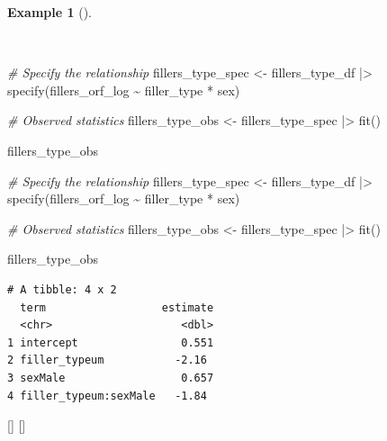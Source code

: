 \documentclass[
  letterpaper,
  krantz1]{latex/krantz-mod}
\newenvironment{Shaded}{\begin{snugshade}}{\end{snugshade}}
\newcommand{\CommentTok}[1]{\textcolor[rgb]{0.00,0.00,0.00}{\textit{#1}}}
\newcommand{\FunctionTok}[1]{\textcolor[rgb]{0.00,0.00,0.00}{#1}}
\newcommand{\NormalTok}[1]{\textcolor[rgb]{0.00,0.00,0.00}{#1}}
\newcommand{\OtherTok}[1]{\textcolor[rgb]{0.00,0.00,0.00}{#1}}
\newcommand{\SpecialCharTok}[1]{\textcolor[rgb]{0.00,0.00,0.00}{#1}}
\newcommand{\cindex}[1]{%
  \StrSubstitute{#1}{_}{\_}[\temp]%
  \index{\temp}%
}
\theoremstyle{definition}
\theoremstyle{definition}
\newtheorem{example}{Example}[chapter]
\theoremstyle{remark}
\begin{document}
\begin{example}[]\protect\hypertarget{exm-infer-num-multi-spec}{}\label{exm-infer-num-multi-spec}

~

\begin{Shaded}
\begin{Highlighting}[numbers=left,,]
\CommentTok{\# Specify the relationship}
\NormalTok{fillers\_type\_spec }\OtherTok{\textless{}{-}}
\NormalTok{  fillers\_type\_df }\SpecialCharTok{|\textgreater{}}
  \FunctionTok{specify}\NormalTok{(fillers\_orf\_log }\SpecialCharTok{\textasciitilde{}}\NormalTok{ filler\_type }\SpecialCharTok{*}\NormalTok{ sex)}

\CommentTok{\# Observed statistics}
\NormalTok{fillers\_type\_obs }\OtherTok{\textless{}{-}}
\NormalTok{  fillers\_type\_spec }\SpecialCharTok{|\textgreater{}}
  \FunctionTok{fit}\NormalTok{()}

\NormalTok{fillers\_type\_obs}
\end{Highlighting}
\end{Shaded}

\vspace{1em}

\begin{Shaded}
\begin{Highlighting}[numbers=left,,]
\CommentTok{\# Specify the relationship}
\NormalTok{fillers\_type\_spec }\OtherTok{\textless{}{-}}
\NormalTok{  fillers\_type\_df }\SpecialCharTok{|\textgreater{}}
  \FunctionTok{specify}\NormalTok{(fillers\_orf\_log }\SpecialCharTok{\textasciitilde{}}\NormalTok{ filler\_type }\SpecialCharTok{*}\NormalTok{ sex)}

\CommentTok{\# Observed statistics}
\NormalTok{fillers\_type\_obs }\OtherTok{\textless{}{-}}
\NormalTok{  fillers\_type\_spec }\SpecialCharTok{|\textgreater{}}
  \FunctionTok{fit}\NormalTok{()}

\NormalTok{fillers\_type\_obs}
\end{Highlighting}
\end{Shaded}

\begin{verbatim}
# A tibble: 4 x 2
  term                  estimate
  <chr>                    <dbl>
1 intercept                0.551
2 filler_typeum           -2.16 
3 sexMale                  0.657
4 filler_typeum:sexMale   -1.84 
\end{verbatim}

 \cindex{specify()}\cindex{fit()}

\end{example}
\end{document}
